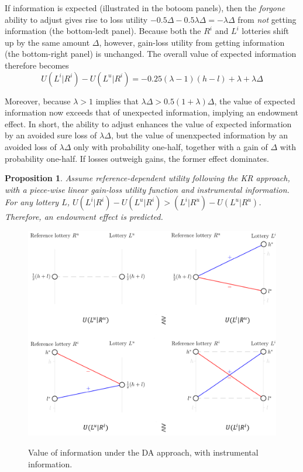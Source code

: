 \documentclass[12pt]{article}
\newtheorem{prop}{Proposition}
\begin{document}
If information is expected (illustrated in the botoom panels), then the \emph{forgone} ability to adjust gives rise to loss utility $-0.5\Delta - 0.5 \lambda \Delta = -\lambda \Delta$ from \emph{not} getting information (the bottom-ledt panel). Because both the $R^i$ and $L^i$ lotteries shift up by the same amount $\Delta$, however, gain-loss utility from getting information (the bottom-right panel) is unchanged. The overall value of expected information therefore becomes
\begin{equation*}
  U(L^i|R^i)-U(L^u|R^i)=-0.25(\lambda-1)(h-l)+\lambda +\lambda \Delta
\end{equation*}

Moreover, because $\lambda>1$ implies that $\lambda \Delta > 0.5(1+\lambda)\Delta$, the value of expected information now exceeds that of unexpected information, implying an endowment effect. In short, the ability to adjust enhances the value of expected information by an avoided sure loss of $\lambda \Delta$, but the value of unenxpected information by an avoided loss of $\lambda \Delta$ only with probability one-half, together with a gain of $\Delta$ with probability one-half. If losses outweigh gains, the former effect dominates.

\FloatBarrier

\begin{prop}
  Assume reference-dependent utility following the KR approach, with a piece-wise linear gain-loss utility function and instrumental information. For any lottery $L$, $U(L^i|R^i)-U(L^u|R^i)>(L^i|R^u)-U(L^u|R^u)$. Therefore, an endowment effect is predicted.
  \label{prop:instrumental-KR}
\end{prop}

\begin{figure}[ht]
  \caption{Value of information under the DA approach, with instrumental information.}\label{fig:instrumental-KR}
  \begin{center}
  {\includegraphics[width=1\textwidth]{./figures/theory_fig4.png}}
  \end{center}
\end{figure}
\end{document}
